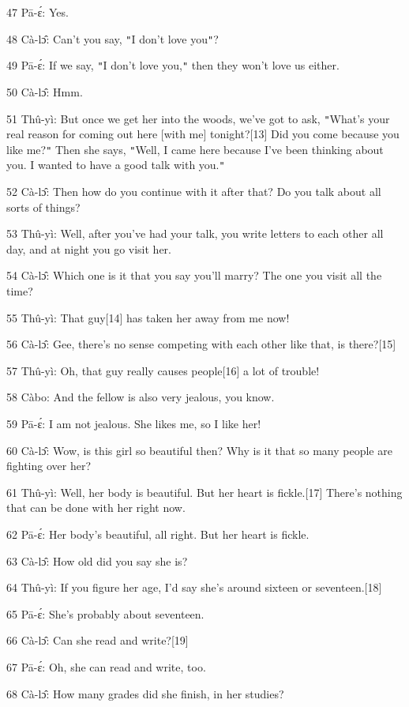 {47 Pā-ɛ́: Yes.}

{48 Cà-lɔ̂: Can't you say, \texttt{"}I don't love you\texttt{"}?}

{49 Pā-ɛ́: If we say, \texttt{"}I don't love you,\texttt{"} then they
won't love us either.}

{50 Cà-lɔ̂: Hmm.}

{51 Thû-yì: But once we get her into the woods, we've got to ask, \texttt{"}What's
your real reason for coming out here [with me] tonight?[13] Did you come because
you like me?\texttt{"} Then she says, \texttt{"}Well, I came here because I've
been thinking about you. I wanted to have a good talk with you.\texttt{"} }

{52 Cà-lɔ̂: Then how do you continue with it after that? Do you talk
about all sorts of things?}

{53 Thû-yì: Well, after you've had your talk, you write letters to each
other all day, and at night you go visit her. }

{54 Cà-lɔ̂: Which one is it that you say you'll marry? The one you visit
all the time? }

{55 Thû-yì: That guy[14] has taken her away from me now!}

{56 Cà-lɔ̂: Gee, there's no sense competing with each other like that,
is there?[15]}

{57 Thû-yì: Oh, that guy really causes people[16] a lot of trouble!}

{58 Càbo: And the fellow is also very jealous, you know. }

{59 Pā-ɛ́: I am not jealous. She likes me, so I like her!}

{60 Cà-lɔ̂: Wow, is this girl so beautiful then? Why is it that so many
people are fighting over her?}

{61 Thû-yì: Well, her body is beautiful. But her heart is fickle.[17]
There's nothing that can be done with her right now. }

{62 Pā-ɛ́: Her body's beautiful, all right. But her heart is fickle.}

{63 Cà-lɔ̂: How old did you say she is?}

{64 Thû-yì: If you figure her age, I'd say she's around sixteen or seventeen.[18]}

{65 Pā-ɛ́: She's probably about seventeen.}

{66 Cà-lɔ̂: Can she read and write?[19]}

{67 Pā-ɛ́: Oh, she can read and write, too.}

{68 Cà-lɔ̂: How many grades did she finish, in her studies?}

